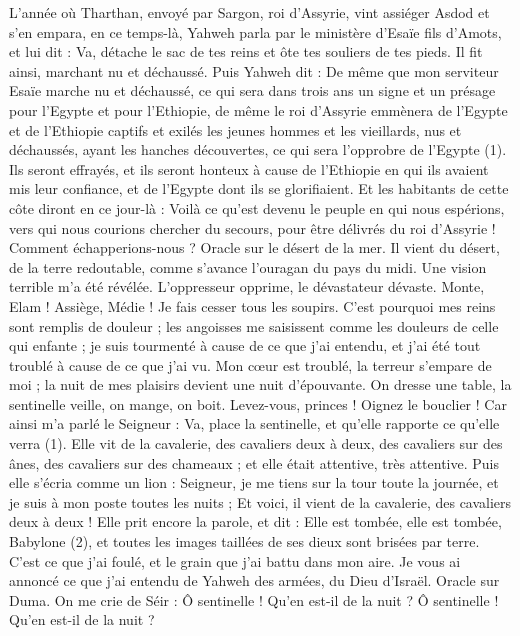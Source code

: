 \begin{multicols}{2}
\VerseOne{}L'année où Tharthan, envoyé par Sargon, roi d'Assyrie, vint assiéger Asdod et s’en empara,
en ce temps-là, Yahweh parla par le ministère d'Esaïe fils d'Amots, et lui dit : Va, détache le sac de tes reins et ôte tes souliers de tes pieds. Il fit ainsi, marchant nu et déchaussé.
Puis Yahweh dit : De même que mon serviteur Esaïe marche nu et déchaussé, ce qui sera dans trois ans un signe et un présage pour l'Egypte et pour l’Ethiopie,
de même le roi d'Assyrie emmènera de l’Egypte et de l’Ethiopie captifs et exilés les jeunes hommes et les vieillards, nus et déchaussés, ayant les hanches découvertes, ce qui sera l'opprobre de l'Egypte (1).
Ils seront effrayés, et ils seront honteux à cause de l’Ethiopie en qui ils avaient mis leur confiance, et de l'Egypte dont ils se glorifiaient.
Et les habitants de cette côte diront en ce jour-là : Voilà ce qu’est devenu le peuple en qui nous espérions, vers qui nous courions chercher du secours, pour être délivrés du roi d’Assyrie ! Comment échapperions-nous ?
\VerseOne{}Oracle sur le désert de la mer. Il vient du désert, de la terre redoutable, comme s’avance l’ouragan du pays du midi.
Une vision terrible m'a été révélée. L’oppresseur opprime, le dévastateur dévaste. Monte, Elam ! Assiège, Médie ! Je fais cesser tous les soupirs.
C'est pourquoi mes reins sont remplis de douleur ; les angoisses me saisissent comme les douleurs de celle qui enfante ; je suis tourmenté à cause de ce que j'ai entendu, et j'ai été tout troublé à cause de ce que j'ai vu.
Mon cœur est troublé, la terreur s’empare de moi ; la nuit de mes plaisirs devient une nuit d’épouvante.
On dresse une table, la sentinelle veille, on mange, on boit. Levez-vous, princes ! Oignez le bouclier !
Car ainsi m’a parlé le Seigneur : Va, place la sentinelle, et qu'elle rapporte ce qu'elle verra (1).
Elle vit de la cavalerie, des cavaliers deux à deux, des cavaliers sur des ânes, des cavaliers sur des chameaux ; et elle était attentive, très attentive.
Puis elle s’écria comme un lion : Seigneur, je me tiens sur la tour toute la journée, et je suis à mon poste toutes les nuits ;
Et voici, il vient de la cavalerie, des cavaliers deux à deux ! Elle prit encore la parole, et dit : Elle est tombée, elle est tombée, Babylone (2), et toutes les images taillées de ses dieux sont brisées par terre.
C'est ce que j'ai foulé, et le grain que j'ai battu dans mon aire. Je vous ai annoncé ce que j'ai entendu de Yahweh des armées, du Dieu d'Israël.
Oracle sur Duma. On me crie de Séir : Ô sentinelle ! Qu’en est-il de la nuit ? Ô sentinelle ! Qu’en est-il de la nuit ?

\end{multicols}
